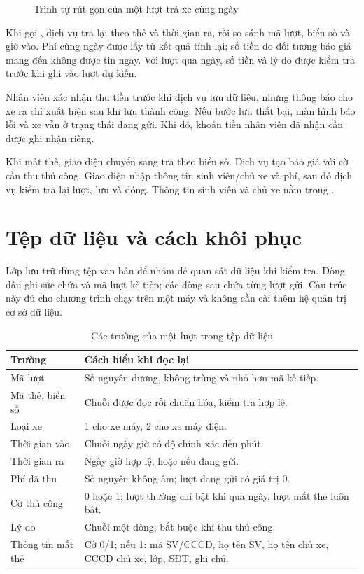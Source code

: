 \begin{figure}[H]
\centering

\caption{Trình tự rút gọn của một lượt trả xe cùng ngày}
\label{fig:checkout-sequence}
\end{figure}

Khi gọi , dịch vụ tra lại theo thẻ và thời gian ra, rồi so sánh mã lượt, biển số và giờ vào. Phí cùng ngày được lấy từ kết quả tính lại; số tiền do đối tượng báo giá mang đến không được tin ngay. Với lượt qua ngày, số tiền và lý do được kiểm tra trước khi ghi vào lượt dự kiến.

Nhân viên xác nhận thu tiền trước khi dịch vụ lưu dữ liệu, nhưng thông báo cho xe ra chỉ xuất hiện sau khi lưu thành công. Nếu bước lưu thất bại, màn hình báo lỗi và xe vẫn ở trạng thái đang gửi. Khi đó, khoản tiền nhân viên đã nhận cần được ghi nhận riêng.

Khi mất thẻ, giao diện chuyển sang tra theo biển số. Dịch vụ tạo báo giá với cờ cần thu thủ công. Giao diện nhập thông tin sinh viên/chủ xe và phí, sau đó dịch vụ kiểm tra lại lượt, lưu và đóng. Thông tin sinh viên và chủ xe nằm trong .

\section{Tệp dữ liệu và cách khôi phục}
Lớp lưu trữ dùng tệp văn bản để nhóm dễ quan sát dữ liệu khi kiểm tra. Dòng đầu ghi sức chứa và mã lượt kế tiếp; các dòng sau chứa từng lượt gửi. Cấu trúc này đủ cho chương trình chạy trên một máy và không cần cài thêm hệ quản trị cơ sở dữ liệu.

\begin{table}[H]
\centering\small
\caption{Các trường của một lượt trong tệp dữ liệu}
\label{tab:file-fields}
\begin{tabularx}{\textwidth}{l Y}
\toprule
Trường & Cách hiểu khi đọc lại\\
\midrule
Mã lượt & Số nguyên dương, không trùng và nhỏ hơn mã kế tiếp.\\
Mã thẻ, biển số & Chuỗi được đọc rồi chuẩn hóa, kiểm tra hợp lệ.\\
Loại xe & 1 cho xe máy, 2 cho xe máy điện.\\
Thời gian vào & Chuỗi ngày giờ có độ chính xác đến phút.\\
Thời gian ra & Ngày giờ hợp lệ, hoặc \code{-} nếu đang gửi.\\
Phí đã thu & Số nguyên không âm; lượt đang gửi có giá trị 0.\\
Cờ thủ công & 0 hoặc 1; lượt thường chỉ bật khi qua ngày, lượt mất thẻ luôn bật.\\
Lý do & Chuỗi một dòng; bắt buộc khi thu thủ công.\\
Thông tin mất thẻ & Cờ 0/1; nếu 1: mã SV/CCCD, họ tên SV, họ tên chủ xe, CCCD chủ xe, lớp, SĐT, ghi chú.\\
\bottomrule
\end{tabularx}
\end{table}

